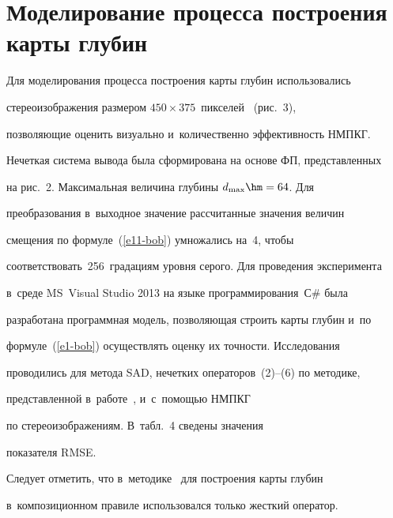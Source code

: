 \section{Моделирование процесса построения карты глубин}








Для моделирования процесса построения карты глубин использовались 


стереоизображения размером $450\times375$~пикселей~\cite{11-bob} (рис.~3), 


позволяющие оценить визуально и~количественно эффективность НМПКГ. 


Нечеткая система вывода была сформирована на основе ФП, представленных 


на рис.~2. Максимальная величина глубины $d_{\max}\hm=64$. Для 


преобразования в~выходное значение рассчитанные значения величин 


смещения по формуле~(\ref{e11-bob}) умножались на~4, чтобы 


соответствовать~256~градациям уровня серого. Для проведения эксперимента 


в~среде MS~Visual Studio 2013 на языке программирования~С\# была 


разработана программная модель, позволяющая строить карты глубин и~по 


формуле~(\ref{e1-bob}) осуществлять оценку их точности. Исследования 


проводились для метода SAD, нечетких операторов~(2)--(6) по методике, 


представленной в~работе~\cite{8-bob}, и~с~по\-мощью НМПКГ 


по стереоизображениям. В~табл.~4 сведены значения 


показателя RMSE.











  Следует отметить, что в~методике~\cite{8-bob} для построения карты глубин 


в~композиционном правиле использовался только жесткий оператор.


  


